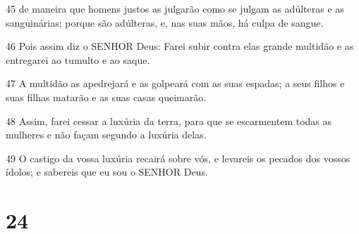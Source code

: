 \par 45 de maneira que homens justos as julgarão como se julgam as adúlteras e as sanguinárias; porque são adúlteras, e, nas suas mãos, há culpa de sangue.
\par 46 Pois assim diz o SENHOR Deus: Farei subir contra elas grande multidão e as entregarei ao tumulto e ao saque.
\par 47 A multidão as apedrejará e as golpeará com as suas espadas; a seus filhos e suas filhas matarão e as suas casas queimarão.
\par 48 Assim, farei cessar a luxúria da terra, para que se escarmentem todas as mulheres e não façam segundo a luxúria delas.
\par 49 O castigo da vossa luxúria recairá sobre vós, e levareis os pecados dos vossos ídolos; e sabereis que eu sou o SENHOR Deus.

\chapter{24}

